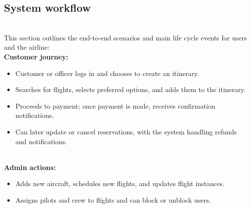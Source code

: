 \subsection{System workflow}\label{vWv_3yvp0I9-NZLRRchhB}
\\
This section outlines the end-to-end scenarios and main life cycle events for users and the airline:
\\
\textbf{Customer journey:}

\begin{itemize}
\item
\protect{}\label{SDkDTwO_1nozSR5h5Nvtg}
Customer or officer logs in and chooses to create an itinerary.
\item
\protect{}\label{espsycRN_5UFda6M3CRXN}
Searches for flights, selects preferred options, and adds them to the itinerary.
\item
\protect{}\label{Nl3wvEqtishr2SvtxdAnD}
Proceeds to payment; once payment is made, receives confirmation notifications.
\item
\protect{}\label{1A6VL4N-wkx-D3l11F-Ui}
Can later update or cancel reservations, with the system handling refunds and notifications.
\end{itemize}
\\
\textbf{Admin actions:}

\begin{itemize}
\item
\protect{}\label{B2T5Vn4hED8vxDM5sRxbC}
Adds new aircraft, schedules new flights, and updates flight instances.
\item
\protect{}\label{OEnktboLzCVz1Rpr3oyNK}
Assigns pilots and crew to flights and can block or unblock users.
\end{itemize}


